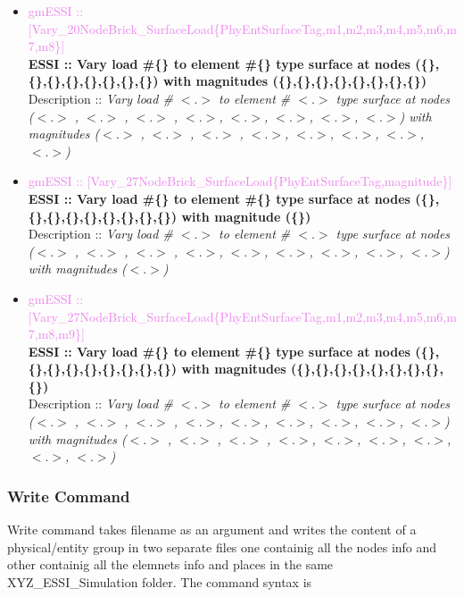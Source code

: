 \documentclass[11pt]{article}
\begin{document}
\begin{itemize}
  \item \textcolor{violet} {gmESSI :: [Vary\_20NodeBrick\_SurfaceLoad\{PhyEntSurfaceTag,m1,m2,m3,m4,m5,m6,m7,m8\}]}\\
  \textbf{ESSI :: Vary load \#\{\} to element \#\{\} type surface at nodes (\{\},\{\},\{\},\{\},\{\},\{\},\{\},\{\}) with magnitudes (\{\},\{\},\{\},\{\},\{\},\{\},\{\},\{\})}\\
  Description :: \textit{Vary load \# $<.>$ to element \# $<.>$ type surface at nodes ($<.>$ , $<.>$ , $<.>$ , $<.>$, $<.>$, $<.>$, $<.>$, $<.>$) with magnitudes ($<.>$ , $<.>$ , $<.>$ , $<.>$, $<.>$, $<.>$, $<.>$, $<.>$)}

  \item \textcolor{violet} {gmESSI :: [Vary\_27NodeBrick\_SurfaceLoad\{PhyEntSurfaceTag,magnitude\}]}\\             
  \textbf{ESSI :: Vary load \#\{\} to element \#\{\} type surface at nodes (\{\},\{\},\{\},\{\},\{\},\{\},\{\},\{\},\{\}) with magnitude (\{\})}\\
  Description :: \textit{Vary load \# $<.>$ to element \# $<.>$ type surface at nodes ($<.>$ , $<.>$ , $<.>$ , $<.>$, $<.>$, $<.>$, $<.>$, $<.>$, $<.>$) with magnitudes ($<.>$)}

  \item \textcolor{violet} {gmESSI :: [Vary\_27NodeBrick\_SurfaceLoad\{PhyEntSurfaceTag,m1,m2,m3,m4,m5,m6,m7,m8,m9\}]}\\  
  \textbf{ESSI :: Vary load \#\{\} to element \#\{\} type surface at nodes (\{\},\{\},\{\},\{\},\{\},\{\},\{\},\{\},\{\}) with magnitudes (\{\},\{\},\{\},\{\},\{\},\{\},\{\},\{\},\{\})}\\
  Description :: \textit{Vary load \# $<.>$ to element \# $<.>$ type surface at nodes ($<.>$ , $<.>$ , $<.>$ , $<.>$, $<.>$, $<.>$, $<.>$, $<.>$, $<.>$) with magnitudes ($<.>$ , $<.>$ , $<.>$ , $<.>$, $<.>$, $<.>$, $<.>$, $<.>$, $<.>$)}

\end{itemize}


\subsubsection{Write Command}
Write command takes filename as an argument and writes the content of a physical/entity group in two separate files one containig all the nodes info and other containig all the elemnets info and places in the same XYZ\_ESSI\_Simulation folder. The command syntax is 
\end{document}
